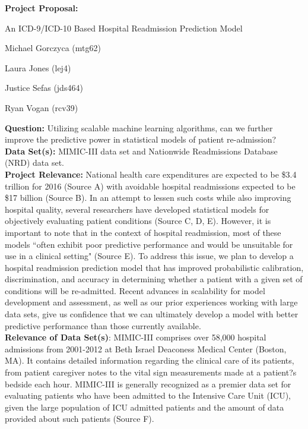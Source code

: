 \documentclass [11pt]{article}
\begin{document}
\large
\centerline{{\bf Project Proposal:}}
\centerline{An ICD-9/ICD-10 Based Hospital Readmission Prediction Model}
\vspace{0.25in}
\small
\centerline{Michael Gorczyca (mtg62)}
\centerline{Laura Jones (lej4)}
\centerline{Justice Sefas (jds464)}
\centerline{Ryan Vogan (rcv39)}

\vspace{0.25in}
\large	
\noindent						
{\bf Question:}  Utilizing scalable machine learning algorithms, can we further improve the predictive power in statistical models of patient re-admission?\\

\noindent
{\bf Data Set(s):} MIMIC-III data set and Nationwide Readmissions Database (NRD) data set.\\

\noindent
{\bf Project Relevance:} National health care expenditures are expected to be \$3.4 trillion for 2016 (Source A) with avoidable hospital readmissions expected to be \$17 billion (Source B). In an attempt to lessen such costs while also improving hospital quality, several researchers have developed statistical models for objectively evaluating patient conditions (Source C, D, E). However, it is important to note that in the context of hospital readmission, most of these models ``often exhibit poor predictive performance and would be unsuitable for use in a clinical setting" (Source E). To address this issue, we plan to develop a hospital readmission prediction model that has improved probabilistic calibration, discrimination, and accuracy in determining whether a patient with a given set of conditions will be re-admitted. Recent advances in scalability for model development and assessment, as well as our prior experiences working with large data sets, give us  confidence that we can ultimately develop a model with better predictive performance than those currently available.\\

\noindent
{\bf Relevance of Data Set(s)}: MIMIC-III comprises over 58,000 hospital admissions from 2001-2012 at Beth Israel Deaconess Medical Center (Boston, MA). It contains detailed information regarding the clinical care of its patients, from patient caregiver notes to the vital sign measurements made at a patient?s bedside each hour. MIMIC-III is generally recognized as a premier data set for evaluating patients who have been admitted to the Intensive Care Unit (ICU), given the large population of ICU admitted patients and the amount of data provided about such patients (Source F).
\end{document}

